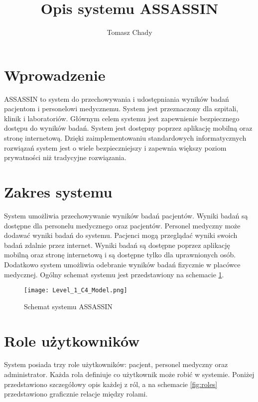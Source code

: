 \documentclass{documentation}
\title{Opis systemu ASSASSIN}
\author{Tomasz Chady}
\begin{document}
\maketitle

\section{Wprowadzenie}

ASSASSIN to system do przechowywania i udostępniania wyników badań pacjentom i personelowi medycznemu.
System jest przeznaczony dla szpitali, klinik i laboratoriów.
Głównym celem systemu jest zapewnienie bezpiecznego dostępu do wyników badań.
System jest dostępny poprzez aplikację mobilną oraz stronę internetową.
Dzięki zaimplementowaniu standardowych informatycznych rozwiązań system jest o wiele bezpieczniejszy i zapewnia większy poziom prywatności niż tradycyjne rozwiązania.

\section{Zakres systemu}

System umożliwia przechowywanie wyników badań pacjentów.
Wyniki badań są dostępne dla personelu medycznego oraz pacjentów.
Personel medyczny może dodawać wyniki badań do systemu.
Pacjenci mogą przeglądać wyniki swoich badań zdalnie przez internet.
Wyniki badań są dostępne poprzez aplikację mobilną oraz stronę internetową i są dostępne tylko dla uprawnionych osób.
Dodatkowo system umożliwia odebranie wyników badań fizycznie w placówce medycznej.
Ogólny schemat systemu jest przedstawiony na schemacie \ref{fig:system}.

\begin{figure}[h]
    \centering
    \texttt{[image: Level\_1\_C4\_Model.png]}
    \caption{Schemat systemu ASSASSIN\label{fig:system}}
\end{figure}

\section{Role użytkowników}

System posiada trzy role użytkowników: pacjent, personel medyczny oraz administrator.
Każda rola definiuje co użytkownik może robić w systemie.
Poniżej przedstawiono szczegółowy opis każdej z ról, a na schemacie \ref{fig:roles} przedstawiono graficznie relacje między rolami.
\end{document}
